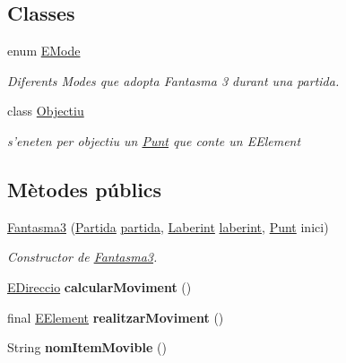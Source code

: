 \subsection*{Classes}
\begin{DoxyCompactItemize}
\item 
enum \hyperlink{enumlogica_1_1_fantasma3_1_1_e_mode}{E\+Mode}
\begin{DoxyCompactList}\small\item\em Diferents Modes que adopta Fantasma 3 durant una partida. \end{DoxyCompactList}\item 
class \hyperlink{classlogica_1_1_fantasma3_1_1_objectiu}{Objectiu}
\begin{DoxyCompactList}\small\item\em s'eneten per objectiu un \hyperlink{classlogica_1_1_punt}{Punt} que conte un E\+Element \end{DoxyCompactList}\end{DoxyCompactItemize}
\subsection*{Mètodes públics}
\begin{DoxyCompactItemize}
\item 
\hyperlink{classlogica_1_1_fantasma3_a282c4af4b988e9d0b43bc23f454ff72e}{Fantasma3} (\hyperlink{classlogica_1_1_partida}{Partida} \hyperlink{classlogica_1_1_item_movible_ace55b4918a7f671f89ed3109c91359e4}{partida}, \hyperlink{classlogica_1_1laberints_1_1_laberint}{Laberint} \hyperlink{classlogica_1_1_item_movible_a97036130b7376d77776427ca126f6fb5}{laberint}, \hyperlink{classlogica_1_1_punt}{Punt} inici)
\begin{DoxyCompactList}\small\item\em Constructor de \hyperlink{classlogica_1_1_fantasma3}{Fantasma3}. \end{DoxyCompactList}\item 
\hypertarget{classlogica_1_1_fantasma3_a91a5d6c42601d67d3696d733d1f8a8ee}{\hyperlink{enumlogica_1_1enumeracions_1_1_e_direccio}{E\+Direccio} {\bfseries calcular\+Moviment} ()}\label{classlogica_1_1_fantasma3_a91a5d6c42601d67d3696d733d1f8a8ee}

\item 
\hypertarget{classlogica_1_1_fantasma3_a7b70c6232bc51b5d11bcb54c6d19158f}{final \hyperlink{enumlogica_1_1enumeracions_1_1_e_element}{E\+Element} {\bfseries realitzar\+Moviment} ()}\label{classlogica_1_1_fantasma3_a7b70c6232bc51b5d11bcb54c6d19158f}

\item 
\hypertarget{classlogica_1_1_fantasma3_a4c111994855d2c11600f301de6a449fa}{String {\bfseries nom\+Item\+Movible} ()}\label{classlogica_1_1_fantasma3_a4c111994855d2c11600f301de6a449fa}

\end{DoxyCompactItemize}
